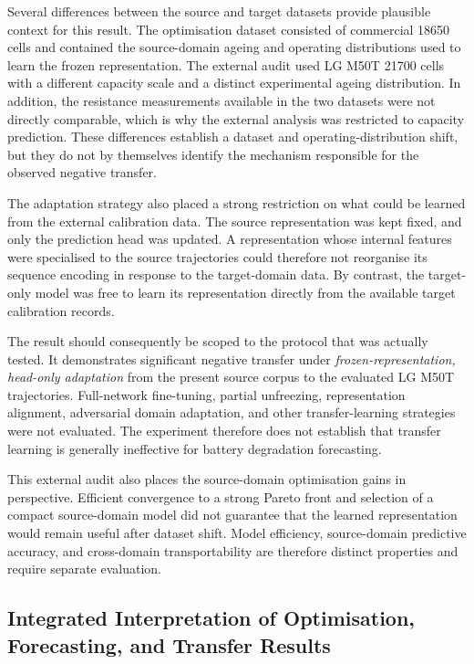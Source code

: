 \documentclass[a4paper,fleqn]{cas-sc}
\begin{document}
Several differences between the source and target datasets provide plausible
context for this result. The optimisation dataset consisted of commercial
18650 cells and contained the source-domain ageing and operating
distributions used to learn the frozen representation. The external audit
used LG M50T 21700 cells with a different capacity scale and a distinct
experimental ageing distribution. In addition, the resistance measurements
available in the two datasets were not directly comparable, which is why the
external analysis was restricted to capacity prediction. These differences
establish a dataset and operating-distribution shift, but they do not by
themselves identify the mechanism responsible for the observed negative
transfer.

The adaptation strategy also placed a strong restriction on what could be
learned from the external calibration data. The source representation was
kept fixed, and only the prediction head was updated. A representation whose
internal features were specialised to the source trajectories could therefore
not reorganise its sequence encoding in response to the target-domain data.
By contrast, the target-only model was free to learn its representation
directly from the available target calibration records.

The result should consequently be scoped to the protocol that was actually
tested. It demonstrates significant negative transfer under
\emph{frozen-representation, head-only adaptation} from the present source
corpus to the evaluated LG M50T trajectories. Full-network fine-tuning,
partial unfreezing, representation alignment, adversarial domain adaptation,
and other transfer-learning strategies were not evaluated. The experiment
therefore does not establish that transfer learning is generally ineffective
for battery degradation forecasting.

This external audit also places the source-domain optimisation gains in
perspective. Efficient convergence to a strong Pareto front and selection of
a compact source-domain model did not guarantee that the learned
representation would remain useful after dataset shift. Model efficiency,
source-domain predictive accuracy, and cross-domain transportability are
therefore distinct properties and require separate evaluation.


\subsection{Integrated Interpretation of Optimisation, Forecasting, and Transfer Results}
\label{sec:overall_discussion}
\end{document}
